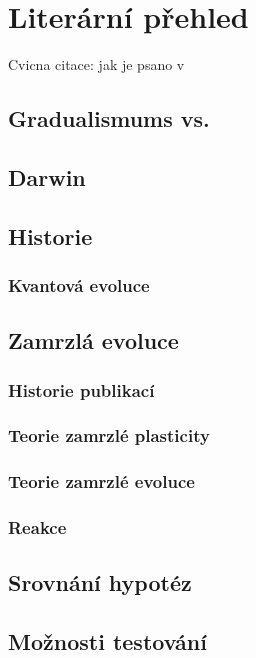 \chapter{Literární přehled}

Cvicna citace: jak je psano v~\citet{Lamport1994}

\section{Gradualismums vs.}

\section{Darwin}

\section{Historie}

\subsection{Kvantová evoluce}

\section{Zamrzlá evoluce}
\subsection{Historie publikací}
\subsection{Teorie zamrzlé plasticity}
\subsection{Teorie zamrzlé evoluce}
\subsection{Reakce}

\section{Srovnání hypotéz}

\section{Možnosti testování}
